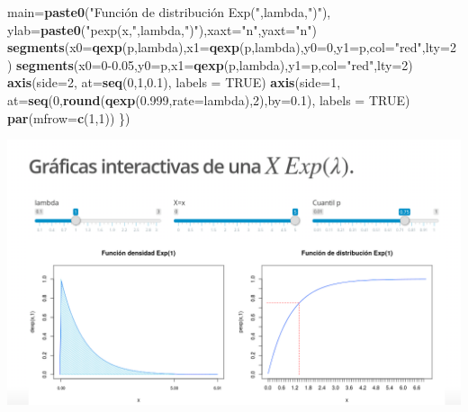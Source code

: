 \documentclass[]{book}
\newenvironment{Shaded}{\begin{snugshade}}{\end{snugshade}}
\newcommand{\DataTypeTok}[1]{\textcolor[rgb]{0.13,0.29,0.53}{#1}}
\newcommand{\DecValTok}[1]{\textcolor[rgb]{0.00,0.00,0.81}{#1}}
\newcommand{\FloatTok}[1]{\textcolor[rgb]{0.00,0.00,0.81}{#1}}
\newcommand{\KeywordTok}[1]{\textcolor[rgb]{0.13,0.29,0.53}{\textbf{#1}}}
\newcommand{\NormalTok}[1]{#1}
\newcommand{\OtherTok}[1]{\textcolor[rgb]{0.56,0.35,0.01}{#1}}
\newcommand{\StringTok}[1]{\textcolor[rgb]{0.31,0.60,0.02}{#1}}
\begin{document}
\begin{Shaded}
\begin{Highlighting}[]
        \DataTypeTok{main=}\KeywordTok{paste0}\NormalTok{(}\StringTok{"Función de distribución Exp("}\NormalTok{,lambda,}\StringTok{")"}\NormalTok{),}
        \DataTypeTok{ylab=}\KeywordTok{paste0}\NormalTok{(}\StringTok{"pexp(x,"}\NormalTok{,lambda,}\StringTok{")"}\NormalTok{),}\DataTypeTok{xaxt=}\StringTok{"n"}\NormalTok{,}\DataTypeTok{yaxt=}\StringTok{"n"}\NormalTok{)}
  \KeywordTok{segments}\NormalTok{(}\DataTypeTok{x0=}\KeywordTok{qexp}\NormalTok{(p,lambda),}\DataTypeTok{x1=}\KeywordTok{qexp}\NormalTok{(p,lambda),}\DataTypeTok{y0=}\DecValTok{0}\NormalTok{,}\DataTypeTok{y1=}\NormalTok{p,}\DataTypeTok{col=}\StringTok{"red"}\NormalTok{,}\DataTypeTok{lty=}\DecValTok{2}\NormalTok{)}
  \KeywordTok{segments}\NormalTok{(}\DataTypeTok{x0=}\DecValTok{0}\FloatTok{-0.05}\NormalTok{,}\DataTypeTok{y0=}\NormalTok{p,}\DataTypeTok{x1=}\KeywordTok{qexp}\NormalTok{(p,lambda),}\DataTypeTok{y1=}\NormalTok{p,}\DataTypeTok{col=}\StringTok{"red"}\NormalTok{,}\DataTypeTok{lty=}\DecValTok{2}\NormalTok{)}
  \KeywordTok{axis}\NormalTok{(}\DataTypeTok{side=}\DecValTok{2}\NormalTok{, }\DataTypeTok{at=}\KeywordTok{seq}\NormalTok{(}\DecValTok{0}\NormalTok{,}\DecValTok{1}\NormalTok{,}\FloatTok{0.1}\NormalTok{), }\DataTypeTok{labels =} \OtherTok{TRUE}\NormalTok{)}
  \KeywordTok{axis}\NormalTok{(}\DataTypeTok{side=}\DecValTok{1}\NormalTok{, }\DataTypeTok{at=}\KeywordTok{seq}\NormalTok{(}\DecValTok{0}\NormalTok{,}\KeywordTok{round}\NormalTok{(}\KeywordTok{qexp}\NormalTok{(}\FloatTok{0.999}\NormalTok{,}\DataTypeTok{rate=}\NormalTok{lambda),}\DecValTok{2}\NormalTok{),}\DataTypeTok{by=}\FloatTok{0.1}\NormalTok{), }\DataTypeTok{labels =} \OtherTok{TRUE}\NormalTok{)}
  \KeywordTok{par}\NormalTok{(}\DataTypeTok{mfrow=}\KeywordTok{c}\NormalTok{(}\DecValTok{1}\NormalTok{,}\DecValTok{1}\NormalTok{))}
\NormalTok{\})}
\end{Highlighting}
\end{Shaded}

\href{https://github.com/joanby/probabilidad}{\includegraphics{Images/noshinyImages/interactiva_exponencial1.png}}
\end{document}

